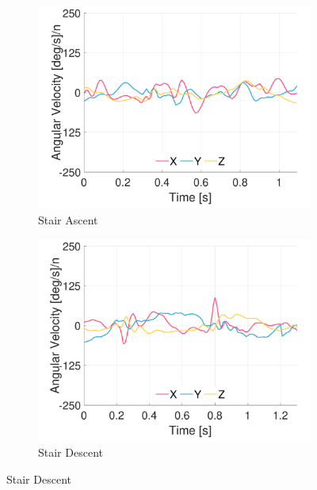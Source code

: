 \begin{figure}[p]
    \begin{subfigure}[b]{0.49\textwidth}
         \centering
         \includegraphics[width=\textwidth]{content/3-Methods/example-data/ch3_example_data_subject_01_r_hip_gyro_activity_stair_down.pdf}
         \caption{Stair Ascent}
    \end{subfigure}
    \begin{subfigure}[b]{0.49\textwidth}
         \centering
         \includegraphics[width=\textwidth]{content/3-Methods/example-data/ch3_example_data_subject_01_r_hip_gyro_activity_stair_up.pdf}
         \caption{Stair Descent}
    \end{subfigure}
    

\end{figure}
